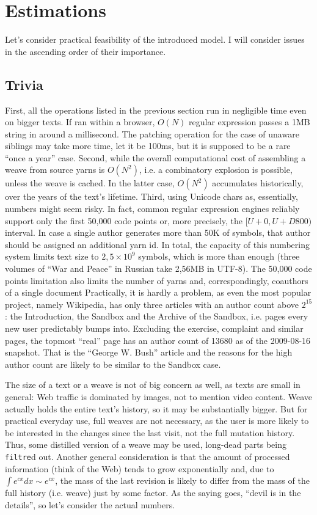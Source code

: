 \documentclass{acm_proc_article-sp}
\begin{document}
\section{Estimations}

Let's consider practical feasibility of the introduced model.
I will consider issues in the ascending order of their
importance. \\

\subsection{Trivia}
First, all the operations
listed in the previous section run in negligible time
even on bigger texts. If ran within a browser, $O(N)$
regular expression passes a 1MB string in around a millisecond.
The patching operation for the case of unaware siblings may
take more time, let it be 100ms, but it is supposed to be a rare
``once a year'' case.
Second, while the overall computational cost of assembling a weave
from source yarns is $O(N^{2})$, i.e. a combinatory
explosion is possible, unless the weave is cached. In the
latter case, $O(N^{2})$ accumulates historically, over the
years of the text's lifetime. 
Third, using Unicode chars as, essentially, numbers
might seem risky. In fact, common regular expression engines
reliably support only the first 50,000 code points or, more
precisely, the $[U+0,U+D800)$ interval. In case a single author
generates more than 50K of symbols, that author should be assigned
an additional yarn id. In total, the capacity of this numbering
system limits text size to $2,5\times10^9$ symbols, which is more
than enough (three volumes of ``War and Peace'' in Russian
take 2,56MB in UTF-8). 
The 50,000 code points limitation also limits the number of yarns
and, correspondingly, coauthors of a single document
Practically, it is hardly a problem, as even the most popular
project, namely Wikipedia, has only three articles with an author
count above $2^{15}$: the Introduction, the Sandbox and the
Archive of the Sandbox, i.e. pages every new user predictably
bumps into. Excluding the exercise, complaint and similar pages,
the topmost ``real'' page has an author count of 13680 as of
the 2009-08-16 snapshot. That is the ``George W. Bush'' article
and the reasons for the high author count are likely to be
similar to the Sandbox case.


The size of a text or a weave is not of big concern as well,
as texts are small in general: Web traffic 
is dominated by images, not to mention video content.
Weave actually holds the entire text's history, so it may
be substantially bigger. But for practical everyday use,
full weaves are
not necessary, as the user is more likely to be interested
in the changes since the last visit, not the full mutation
history. Thus, some distilled version of a weave may be
used, long-dead parts being {\tt filtre}d out. Another general
consideration is that the amount of processed information
(think of the Web) tends to grow exponentially and, due to
$\int e^{cx}dx \sim e^{cx}$, the mass of the last
revision is likely to differ from the mass of the full
history (i.e. weave) just by some factor. As the saying
goes, ``devil is in the details'', so let's consider the
actual numbers.
\end{document}

